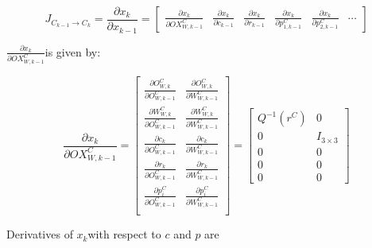 \begin{equation}
J_{C_{k-1}\to C_{k}}=\frac{\partial x_{k}}{\partial x_{k-1}}=\begin{bmatrix}
\frac{\partial x_{k}}{\partial OX_{W, k-1}^{C}} &
\frac{\partial x_{k}}{\partial c_{k-1}} & 
\frac{\partial x_{k}}{\partial r_{k-1}} & 
\frac{\partial x_{k}}{\partial p_{1, k-1}^{C}} &
\frac{\partial x_{k}}{\partial p_{2, k-1}^{C}} &
\cdots 
\end{bmatrix}
\end{equation}

$\frac{\partial x_{k}}{\partial OX_{W, k-1}^{C}}$is given by:

\begin{equation}
\frac{\partial x_{k}}{\partial OX_{W, k-1}^{C}}=\begin{bmatrix}
\frac{\partial O_{W,k}^{C}}{\partial O_{W,k-1}^{C}} & 
\frac{\partial O_{W,k}^{C}}{\partial W_{W,k-1}^{C}} \\
\frac{\partial W_{W,k}^{C}}{\partial O_{W,k-1}^{C}} & 
\frac{\partial W_{W,k}^{C}}{\partial W_{W,k-1}^{C}} \\
\frac{\partial c_{k}}{\partial O_{W,k-1}^{C}} &
\frac{\partial c_{k}}{\partial W_{W,k-1}^{C}} \\
\frac{\partial r_{k}}{\partial O_{W,k-1}^{C}} &
\frac{\partial r_{k}}{\partial W_{W,k-1}^{C}} \\
\frac{\partial p_{i}^{C}}{\partial O_{W,k-1}^{C}} & 
\frac{\partial p_{i}^{C}}{\partial W_{W,k-1}^{C}} \\
\end{bmatrix}= \begin{bmatrix}
Q^{-1}(r^{C}) & 0 \\
0 & I_{3\times 3} \\
0 & 0 \\
0 & 0 \\
0 & 0 
\end{bmatrix}
\end{equation}


Derivatives of $x_{k}$with respect to $c$ and $p$ are 


